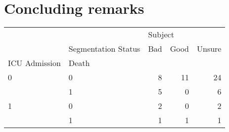 \chapter{Concluding remarks}

\begin{tabular}{llrrr}
\toprule
  & {} & \multicolumn{3}{l}{Subject} \\
  & Segmentation Status &     Bad & Good & Unsure \\
ICU Admission & Death &         &      &        \\
\midrule
0 & 0 &       8 &   11 &     24 \\
  & 1 &       5 &    0 &      6 \\
1 & 0 &       2 &    0 &      2 \\
  & 1 &       1 &    1 &      1 \\
\bottomrule
\end{tabular}